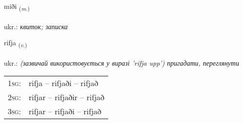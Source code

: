 \documentclass[frontgrid, backgrid]{flacards}\usepackage[]{graphicx}\usepackage[]{xcolor}
\begin{document}
\renewcommand{\blhead}{\vskip5pt {\small\bfseries\footnotesize Nafnorð | іменник }}
\renewcommand{\bcfoot}{\vskip5pt \hspace{2pt}{\small\bfseries\footnotesize 2K}}


{miði \small{\textsubscript{(\textit{m.})}} \\[1ex] %
\textphonetic{[mɪːðɪ]} \\
ukr.: \emph{квиток; записка} \\  [2ex]
\renewcommand*{\arraystretch}{0.8}
}

\renewcommand{\flhead}{\vskip5pt \fboxsep=0pt {\small\bfseries\footnotesize Sagnorð | дієслово}}
\renewcommand{\fcfoot}{\vskip5pt \fboxsep=0pt \hspace{2pt}{\small\bfseries\footnotesize 2K}}

\renewcommand{\blhead}{\vskip5pt {\small\bfseries\footnotesize Sagnorð | дієслово }}
\renewcommand{\bcfoot}{\vskip5pt \hspace{2pt}{\small\bfseries\footnotesize 2K}}


{rifja \small{\textsubscript{(\textit{v.})}} \\[1ex] %
\textphonetic{[rɪvja]} \\
ukr.: \emph{(зазвичай використовується у виразі 'rifja upp') пригадати, переглянути} \\  [2ex]
\renewcommand*{\arraystretch}{0.8}
\begin{tabular}{p{1cm}l}
\textsc{1sg}: & rifja -- rifjaði -- rifjað \\ 
\textsc{2sg}: & rifjar -- rifjaðir -- rifjað \\ 
\textsc{3sg}: & rifjar -- rifjaði -- rifjað \\ 
\end{tabular}
}
\end{document}
